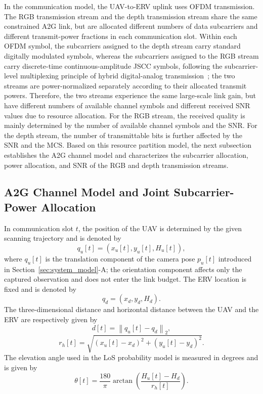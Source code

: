 \documentclass[journal]{IEEEtran}
\begin{document}
In the communication model, the UAV-to-ERV uplink uses OFDM transmission. The RGB transmission stream and the depth transmission stream share the same constrained A2G link, but are allocated different numbers of data subcarriers and different transmit-power fractions in each communication slot. Within each OFDM symbol, the subcarriers assigned to the depth stream carry standard digitally modulated symbols, whereas the subcarriers assigned to the RGB stream carry discrete-time continuous-amplitude JSCC symbols, following the subcarrier-level multiplexing principle of hybrid digital-analog transmission~\cite{B14,B15}; the two streams are power-normalized separately according to their allocated transmit powers. Therefore, the two streams experience the same large-scale link gain, but have different numbers of available channel symbols and different received SNR values due to resource allocation. For the RGB stream, the received quality is mainly determined by the number of available channel symbols and the SNR. For the depth stream, the number of transmittable bits is further affected by the SNR and the MCS. Based on this resource partition model, the next subsection establishes the A2G channel model and characterizes the subcarrier allocation, power allocation, and SNR of the RGB and depth transmission streams.

\subsection{A2G Channel Model and Joint Subcarrier-Power Allocation}

In communication slot $t$, the position of the UAV is determined by the given scanning trajectory and is denoted by
\begin{equation}
q_u[t]
=
\left(
x_u[t],
y_u[t],
H_u[t]
\right),
\end{equation}
where $q_u[t]$ is the translation component of the camera pose $p_u[t]$ introduced in Section~\ref{sec:system_model}-A; the orientation component affects only the captured observation and does not enter the link budget.
The ERV location is fixed and is denoted by
\begin{equation}
q_d
=
\left(
x_d,
y_d,
H_d
\right).
\end{equation}
The three-dimensional distance and horizontal distance between the UAV and the ERV are respectively given by
\begin{equation}
d[t]
=
\left\|
q_u[t]-q_d
\right\|_2,
\end{equation}
\begin{equation}
r_h[t]
=
\sqrt{
\left(x_u[t]-x_d\right)^2
+
\left(y_u[t]-y_d\right)^2
}.
\end{equation}
The elevation angle used in the LoS probability model is measured in degrees and is given by
\begin{equation}
\theta[t]
=
\frac{180}{\pi}
\arctan
\left(
\frac{H_u[t]-H_d}{r_h[t]}
\right).
\end{equation}
\end{document}
